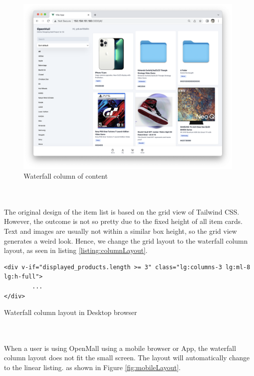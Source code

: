 \documentclass{article}
\begin{document}
\begin{figure}[!htp]
    \centering
    \includegraphics[width=1\textwidth]{waterfall.png}
    \caption{\label{fig:waterfall}Waterfall column of content}
\end{figure}

\leavevmode
\\\\
The original design of the item list is based on the grid view of Tailwind CSS. However, the outcome is not so pretty due to the fixed height of all item cards. Text and images are usually not within a similar box height, so the grid view generates a weird look. Hence, we change the grid layout to the waterfall column layout, as seen in listing  \ref{listing:columnLayout}. 

\begin{listing}[!htp]
\begin{verbatim}
<div v-if="displayed_products.length >= 3" class="lg:columns-3 lg:ml-8 lg:h-full">
        ...
</div>
\end{verbatim}
\caption{Waterfall column layout in Desktop browser}
\label{listing:columnLayout}
\end{listing}

\leavevmode
\\\\
When a user is using OpenMall using a mobile browser or App, the waterfall column layout does not fit the small screen. The layout will automatically change to the linear listing. as shown in Figure \ref{fig:mobileLayout}.
\end{document}

